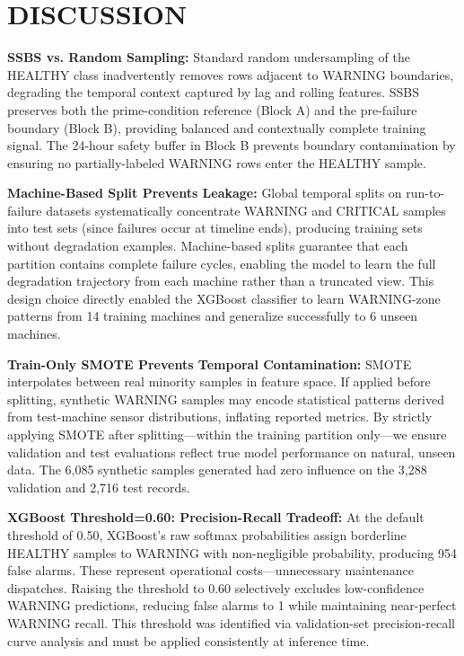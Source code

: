 \documentclass[conference]{IEEEtran}
\begin{document}
\section{DISCUSSION}
\label{sec:discussion}

\textbf{SSBS vs. Random Sampling:} Standard random undersampling of the HEALTHY class inadvertently removes rows adjacent to WARNING boundaries, degrading the temporal context captured by lag and rolling features. SSBS preserves both the prime-condition reference (Block A) and the pre-failure boundary (Block B), providing balanced and contextually complete training signal. The 24-hour safety buffer in Block B prevents boundary contamination by ensuring no partially-labeled WARNING rows enter the HEALTHY sample.

\textbf{Machine-Based Split Prevents Leakage:} Global temporal splits on run-to-failure datasets systematically concentrate WARNING and CRITICAL samples into test sets (since failures occur at timeline ends), producing training sets without degradation examples. Machine-based splits guarantee that each partition contains complete failure cycles, enabling the model to learn the full degradation trajectory from each machine rather than a truncated view. This design choice directly enabled the XGBoost classifier to learn WARNING-zone patterns from 14 training machines and generalize successfully to 6 unseen machines.

\textbf{Train-Only SMOTE Prevents Temporal Contamination:} SMOTE interpolates between real minority samples in feature space. If applied before splitting, synthetic WARNING samples may encode statistical patterns derived from test-machine sensor distributions, inflating reported metrics. By strictly applying SMOTE after splitting—within the training partition only—we ensure validation and test evaluations reflect true model performance on natural, unseen data. The 6,085 synthetic samples generated had zero influence on the 3,288 validation and 2,716 test records.

\textbf{XGBoost Threshold=0.60: Precision-Recall Tradeoff:} At the default threshold of 0.50, XGBoost's raw softmax probabilities assign borderline HEALTHY samples to WARNING with non-negligible probability, producing 954 false alarms. These represent operational costs—unnecessary maintenance dispatches. Raising the threshold to 0.60 selectively excludes low-confidence WARNING predictions, reducing false alarms to 1 while maintaining near-perfect WARNING recall. This threshold was identified via validation-set precision-recall curve analysis and must be applied consistently at inference time.
\end{document}
